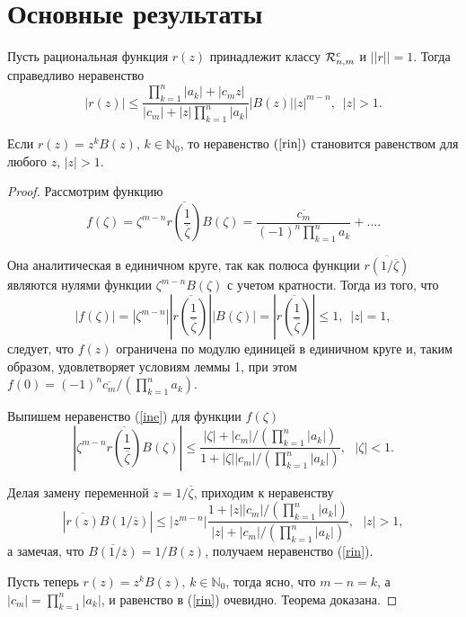 \documentclass[a4paper,12pt,twoside]{article}
\begin{document}
\section*{Основные результаты}

\begin{thm} Пусть рациональная функция $r(z)$ принадлежит классу ${\cal
R}_{n,m}^c$ и $||r||=1$. Тогда справедливо неравенство
\begin{equation}\label{rin}
 |r(z)|\leq \frac{\displaystyle
\prod\limits_{k=1}^{n}|a_k|+|c_mz|}{\displaystyle
|c_m|+|z|\prod\limits_{k=1}^{n}|a_k|}|B(z)||z|^{m-n}, \, \, \, |z|>1.
\end{equation}


Если $r(z)=z^kB(z), \, k\in \mathbb{N}_0$, то неравенство
$(\ref{rin})$ становится равенством для любого $z$, $|z|>1$.
\end{thm}
\medskip

\begin{proof} Рассмотрим функцию
$$
f(\zeta)= \zeta^{m-n}
\overline{r\left(\frac{1}{\overline{\zeta}}\right)}B(\zeta)=
\frac{\overline{c_m}}{(-1)^n\prod\limits_{k=1}^{n}a_k}+ ... .
$$

Она аналитическая в единичном круге, так как полюса функции
$\overline{r(1/\overline{\zeta})}$ являются нулями функции
$\zeta^{m-n}B(\zeta)$ с учетом кратности. Тогда из того, что
$$
|f(\zeta)|= |\zeta^{m-n}|
\left|\overline{r\left(\frac{1}{\overline{\zeta}}\right)}\right||B(\zeta)|=\left|\overline{r\left(\frac{1}{\overline{\zeta}}\right)}\right| \leq 1, \, \, \, |z|=1,
$$
следует, что $f(z)$
 ограничена по модулю единицей в единичном круге и, таким образом, удовлетворяет условиям леммы 1, при этом
$f(0)=(-1)^n\overline{c_m}/\left(\prod\limits_{k=1}^{n}a_k\right)$.

Выпишем неравенство (\ref{ine}) для функции $f(\zeta)$
$$
|\zeta^{m-n}
\overline{r\left(\frac{1}{\overline{\zeta}}\right)}B(\zeta)|\leq
\frac{|\zeta|+|c_m|/\left(\prod\limits_{k=1}^{n}|a_k|\right)}{1+|\zeta||c_m|/\left(\prod\limits_{k=1}^{n}|a_k|\right)}, \, \, \, \, |\zeta|<1.
$$


Делая замену переменной $z=1/\overline{\zeta}$, приходим к
неравенству
$$
|\overline{r(z)}B(1/\overline{z})|\leq
|z^{m-n}|\frac{1+|z||c_m|/\left(\prod\limits_{k=1}^{n}|a_k|\right)}{|z|+|c_m|/\left(\prod\limits_{k=1}^{n}|a_k|\right)}, \, \, \, \, |z|>1,
$$
а замечая, что $\overline{B(1/\overline{z})}=1/B(z)$, получаем
неравенство (\ref{rin}).

 Пусть теперь $r(z)=z^kB(z), \, k\in
\mathbb{N}_0$, тогда ясно, что $m-n=k$, а
$|c_m|=\prod\limits_{k=1}^{n}|a_k|$, и равенство в (\ref{rin})
очевидно. Теорема доказана.
\end{proof}
\end{document}
